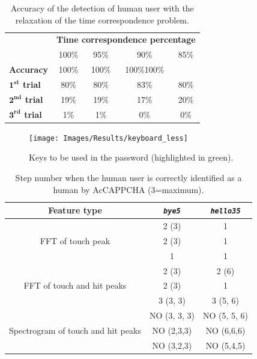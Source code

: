 \begin{table}[H]
\centering\footnotesize
\begin{tabular}{lcccc}
\cline{2-5}
&\multicolumn{4}{c}{\textbf{Time correspondence percentage}}\\
\cline{2-5}
&{100\%}&{95\%}&{90\%}&{85\%}\\
\hline
{\textbf{Accuracy}}&{100\%}&{100\%}&{100\%}{100\%}\\
\hline
{\textbf{$\mathbf{1^{st}}$ trial}}&{80\%}&{80\%}&{83\%}&{80\%}\\
\hline
{\textbf{$\mathbf{2^{nd}}$ trial}}&{19\%}&{19\%}&{17\%}&{20\%}\\
\hline
{\textbf{$\mathbf{3^{rd}}$ trial}}&{1\%}&{1\%}&{0\%}&{0\%}\\
\hline
\end{tabular}
\caption{\footnotesize{Accuracy of the detection of human user with the relaxation of the time correspondence problem.}}
\label{Results:relaxation_time}
\end{table}
\begin{figure}[H]
     \centering
	 \texttt{[image: Images/Results/keyboard\_less]}
     \caption{\footnotesize{Keys to be used in the password (highlighted in green).}}\label{Results:keyboard}
\end{figure}
\begin{table}[H]
\centering\footnotesize
\begin{tabular}{ccc}
\hline
{\textbf{Feature type}}&{\texttt{\textit{bye5}}}&{\texttt{\textit{hello35}}}\\
\hline
\multirow{3}{*}{FFT of touch peak} & {2 (3)} & {1}\\
& {2 (3)} & {1}\\
& {1} & {1}\\
\hline
\multirow{3}{*}{FFT of touch and hit peaks} & {2 (3)} & {2 (6)}\\
& {2 (3)} & {1}\\
& {3 (3, 3)} & {3 (5, 6)}\\
\hline
\multirow{3}{*}{Spectrogram of touch and hit peaks} & {NO (3, 3, 3)} & {NO (5, 5, 6)}\\
& {NO (2,3,3)} & {NO (6,6,6)}\\
& {NO (3,2,3)} & {NO (5,4,5)}\\
\hline
\end{tabular}
\caption{\footnotesize{Step number when the human user is correctly identified as a human by AcCAPPCHA (3=maximum).}}
\label{Results:verification}
\end{table}

